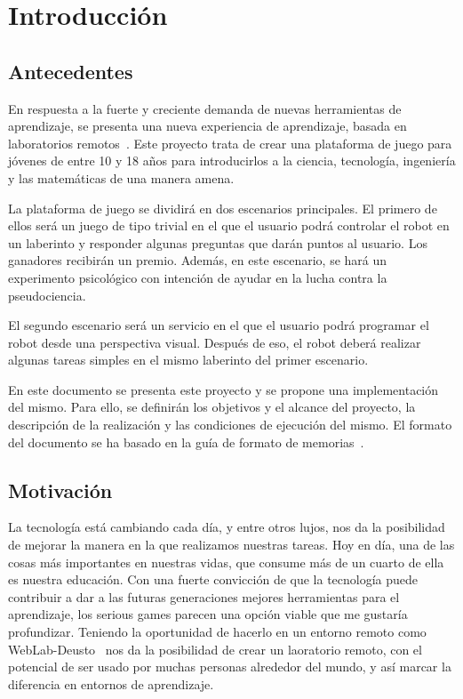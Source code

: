 \chapter{Introducción}

\section{Antecedentes}

En respuesta a la fuerte y creciente demanda de nuevas herramientas de aprendizaje, se presenta una
nueva experiencia de aprendizaje, basada en laboratorios remotos~\cite{remote_labs}. Este proyecto
trata de crear una plataforma de juego para jóvenes de entre 10 y 18 años para introducirlos a la
ciencia, tecnología, ingeniería y las matemáticas de una manera amena.

La plataforma de juego se dividirá en dos escenarios principales. El primero de ellos será un juego
de tipo trivial en el que el usuario podrá controlar el robot en un laberinto y responder algunas
preguntas que darán puntos al usuario. Los ganadores recibirán un premio. Además, en este escenario,
se hará un experimento psicológico con intención de ayudar en la lucha contra la pseudociencia.

El segundo escenario será un servicio en el que el usuario podrá programar el robot desde una
perspectiva visual. Después de eso, el robot deberá realizar algunas tareas simples en el mismo
laberinto del primer escenario.

En este documento se presenta este proyecto y se propone una implementación del mismo. Para ello, se
definirán los objetivos y el alcance del proyecto, la descripción de la realización y las
condiciones de ejecución del mismo. El formato del documento se ha basado en la guía de formato de
memorias~\cite{formato}.

\section{Motivación}

La tecnología está cambiando cada día, y entre otros lujos, nos da la posibilidad de mejorar la manera
en la que realizamos nuestras tareas. Hoy en día, una de las cosas más importantes en nuestras
vidas, que consume más de un cuarto de ella es nuestra educación. Con una fuerte convicción de que
la tecnología puede contribuir a dar a las futuras generaciones mejores herramientas para el
aprendizaje, los serious games parecen una opción viable que me gustaría profundizar. Teniendo la
oportunidad de hacerlo en un entorno remoto como WebLab-Deusto~\cite{weblab} nos da la posibilidad
de crear un laoratorio remoto, con el potencial de ser usado por muchas personas alrededor del
mundo, y así marcar la diferencia en entornos de aprendizaje.
